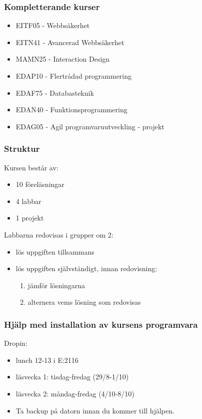 \documentclass[aspectratio=1610]{beamer}
\begin{document}
\begin{frame}
  \frametitle{Kompletterande kurser}
\begin{itemize}
\item EITF05 - Webbsäkerhet
\item EITN41 - Avancerad Webbsäkerhet
\item MAMN25 - Interaction Design
\item EDAP10  - Flertrådad programmering
\item EDAF75 - Databasteknik
\item EDAN40 - Funktionsprogrammering
\item EDAG05 - Agil programvaruutveckling - projekt
\end{itemize}

\end{frame}

\begin{frame}
  \frametitle{Struktur}
Kursen består av:
\begin{itemize}
  \item 10 föreläsningar
  \item 4 labbar
  \item 1 projekt
\end{itemize}
\vspace{2mm}
Labbarna redovisas i grupper om 2:
\begin{itemize}
 \item lös uppgiften tillsammans
 \item lös uppgiften självständigt, innan redovisning:
   \begin{enumerate}
     \item jämför lösningarna
     \item alternera vems lösning som redovisas
   \end{enumerate}
\end{itemize}
\end{frame}

\begin{frame}
  \frametitle{Hjälp med installation av kursens programvara}
Dropin:
\begin{itemize}
  \item lunch 12-13 i E:2116
  \item läsvecka 1: tisdag-fredag (29/8-1/10)
  \item läsvecka 2: måndag-fredag (4/10-8/10)
  \item Ta backup på datorn innan du kommer till hjälpen.
\end{itemize}
\end{frame}
\end{document}
